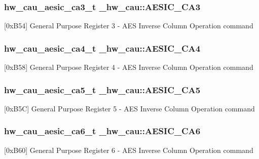 \subsubsection[{\texorpdfstring{A\+E\+S\+I\+C\+\_\+\+C\+A3}{AESIC_CA3}}]{ {\bf hw\+\_\+cau\+\_\+aesic\+\_\+ca3\+\_\+t} \+\_\+hw\+\_\+cau\+::\+A\+E\+S\+I\+C\+\_\+\+C\+A3}\hypertarget{struct__hw__cau_a4732a719c1bc88bbd0bd4ac4e0d21d76}{}\label{struct__hw__cau_a4732a719c1bc88bbd0bd4ac4e0d21d76}
\mbox{[}0x\+B54\mbox{]} General Purpose Register 3 -\/ A\+ES Inverse Column Operation command 
\subsubsection[{\texorpdfstring{A\+E\+S\+I\+C\+\_\+\+C\+A4}{AESIC_CA4}}]{ {\bf hw\+\_\+cau\+\_\+aesic\+\_\+ca4\+\_\+t} \+\_\+hw\+\_\+cau\+::\+A\+E\+S\+I\+C\+\_\+\+C\+A4}\hypertarget{struct__hw__cau_a5083ef6637fdba2104634764cdf478e7}{}\label{struct__hw__cau_a5083ef6637fdba2104634764cdf478e7}
\mbox{[}0x\+B58\mbox{]} General Purpose Register 4 -\/ A\+ES Inverse Column Operation command 
\subsubsection[{\texorpdfstring{A\+E\+S\+I\+C\+\_\+\+C\+A5}{AESIC_CA5}}]{ {\bf hw\+\_\+cau\+\_\+aesic\+\_\+ca5\+\_\+t} \+\_\+hw\+\_\+cau\+::\+A\+E\+S\+I\+C\+\_\+\+C\+A5}\hypertarget{struct__hw__cau_a0f9123ca23f11a84db1ee402c8211270}{}\label{struct__hw__cau_a0f9123ca23f11a84db1ee402c8211270}
\mbox{[}0x\+B5C\mbox{]} General Purpose Register 5 -\/ A\+ES Inverse Column Operation command 
\subsubsection[{\texorpdfstring{A\+E\+S\+I\+C\+\_\+\+C\+A6}{AESIC_CA6}}]{ {\bf hw\+\_\+cau\+\_\+aesic\+\_\+ca6\+\_\+t} \+\_\+hw\+\_\+cau\+::\+A\+E\+S\+I\+C\+\_\+\+C\+A6}\hypertarget{struct__hw__cau_a6280ae12497a86678819b417bacf9790}{}\label{struct__hw__cau_a6280ae12497a86678819b417bacf9790}
\mbox{[}0x\+B60\mbox{]} General Purpose Register 6 -\/ A\+ES Inverse Column Operation command 
